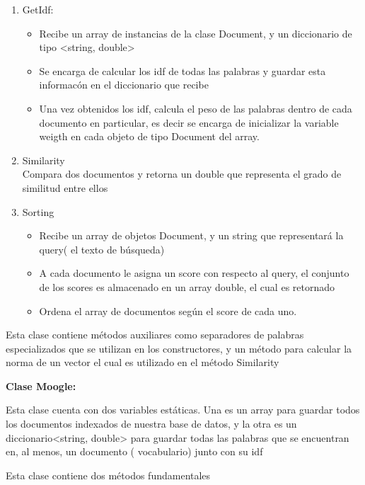 \documentclass[12pt]{article}
\begin{document}
\begin {enumerate}
 \item GetIdf: 
 \begin{itemize}
 \item Recibe un array de instancias de la clase Document, y un diccionario de tipo <string, double> 
 \item Se encarga de calcular los idf de todas las palabras y guardar esta informac\'on en el diccionario que recibe
 \item Una vez obtenidos los idf, calcula el peso de las palabras dentro de cada documento en particular, es decir se encarga de inicializar la variable weigth en cada objeto de tipo Document del array.
\end{itemize}
 
 \item Similarity \\
 Compara dos documentos y retorna un double que representa el grado de similitud entre ellos\\
 
 \item Sorting 
 \begin{itemize}
 \item Recibe un array de objetos Document, y un string que representar\'a la query( el texto de b\'usqueda)
 \item A cada documento le asigna un score con respecto al query, el conjunto de los scores es almacenado en un array double, el cual es retornado
 \item Ordena el array de documentos seg\'un el score de cada uno.
\end{itemize}
\end{enumerate}
 
  Esta clase contiene m\'etodos auxiliares como separadores de palabras especializados que se utilizan en los constructores, y un m\'etodo para calcular la norma de un vector el cual es utilizado en el m\'etodo Similarity\\
 
\newpage

 \textbf{ Clase Moogle:}
 
 Esta clase cuenta con dos variables est\'aticas. Una es un array para guardar todos los documentos indexados de nuestra base de datos, y la otra es un diccionario<string, double> para guardar todas las palabras que se encuentran en, al menos, un documento ( vocabulario)  junto con su idf

Esta clase contiene dos m\'etodos fundamentales 
  
\end{document}
